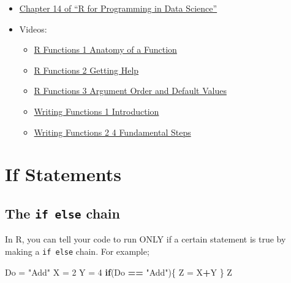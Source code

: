 \documentclass[
]{book}
\newenvironment{Shaded}{\begin{snugshade}}{\end{snugshade}}
\newcommand{\ControlFlowTok}[1]{\textcolor[rgb]{0.13,0.29,0.53}{\textbf{#1}}}
\newcommand{\DecValTok}[1]{\textcolor[rgb]{0.00,0.00,0.81}{#1}}
\newcommand{\NormalTok}[1]{#1}
\newcommand{\OperatorTok}[1]{\textcolor[rgb]{0.81,0.36,0.00}{\textbf{#1}}}
\newcommand{\StringTok}[1]{\textcolor[rgb]{0.31,0.60,0.02}{#1}}
\providecommand{\tightlist}{%
  \setlength{\itemsep}{0pt}\setlength{\parskip}{0pt}}
\begin{document}
\begin{itemize}
\tightlist
\item
  \href{https://bookdown.org/rdpeng/rprogdatascience/functions.html\#the-...-argument}{Chapter 14 of ``R for Programming in Data Science''}
\item
  Videos:

  \begin{itemize}
  \tightlist
  \item
    \href{https://ucr.yuja.com/V/Video?v=2390137\&node=8588230\&a=1409376127\&autoplay=1}{R Functions 1 \textbar{} Anatomy of a Function}
  \item
    \href{https://ucr.yuja.com/V/Video?v=2368890\&node=8488096\&a=1477744713\&autoplay=1}{R Functions 2 \textbar{} Getting Help}
  \item
    \href{https://ucr.yuja.com/V/Video?v=2368889\&node=8488095\&a=762120086\&autoplay=1}{R Functions 3 \textbar{} Argument Order and Default Values}
  \item
    \href{https://ucr.yuja.com/V/Video?v=2700489\&node=9649685\&a=1404409900\&autoplay=1}{Writing Functions 1 \textbar{} Introduction}
  \item
    \href{https://ucr.yuja.com/V/Video?v=2700492\&node=9649688\&a=604881114\&autoplay=1}{Writing Functions 2 \textbar{} 4 Fundamental Steps}
  \end{itemize}
\end{itemize}

\hypertarget{if-statements}{%
\chapter{If Statements}\label{if-statements}}

\hypertarget{the-if-else-chain}{%
\section{\texorpdfstring{The \texttt{if\ else} chain}{The if else chain}}\label{the-if-else-chain}}

In R, you can tell your code to run ONLY if a certain statement is true by making a \texttt{if\ else} chain. For example;

\begin{Shaded}
\begin{Highlighting}[]
\NormalTok{Do =}\StringTok{ "Add"}
\NormalTok{X =}\StringTok{ }\DecValTok{2}
\NormalTok{Y =}\StringTok{ }\DecValTok{4}
\ControlFlowTok{if}\NormalTok{(Do }\OperatorTok{==}\StringTok{ "Add"}\NormalTok{)\{}
\NormalTok{  Z =}\StringTok{ }\NormalTok{X}\OperatorTok{+}\NormalTok{Y}
\NormalTok{\}}
\NormalTok{Z}
\end{Highlighting}
\end{Shaded}
\end{document}
